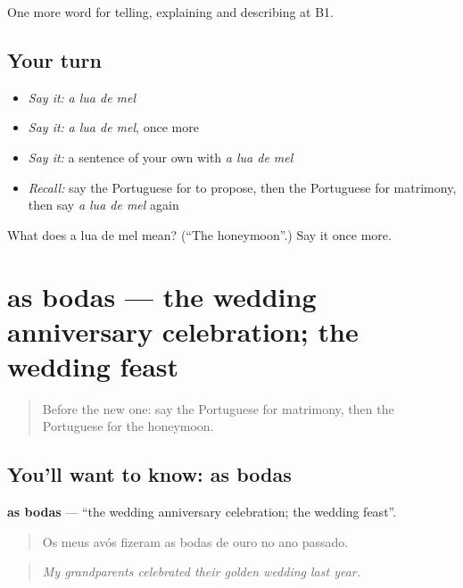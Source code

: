 \begin{grammarlens}[title={What you've built}]
One more word for telling, explaining and describing at B1.
\end{grammarlens}

\subsection*{Your turn}
\begin{itemize}
\raggedright
  \item \emph{Say it:} \emph{a lua de mel}
  \item \emph{Say it:} \emph{a lua de mel}, once more
  \item \emph{Say it:} a sentence of your own with \emph{a lua de mel}
  \item \emph{Recall:} say the Portuguese for to propose, then the Portuguese for matrimony, then say \emph{a lua de mel} again
\end{itemize}

\begin{tcolorbox}[breakable,colback=teal!4,colframe=teal!35!black,title={Before you move on}]
What does a lua de mel mean? (\textquotedblleft{}The honeymoon\textquotedblright{}.) Say it once more.
\end{tcolorbox}
\section[as bodas]{as bodas — the wedding anniversary celebration; the wedding feast}

\label{lesson:PT-C313-bodas}



\begin{quote}
Before the new one: say the Portuguese for matrimony, then the Portuguese for the honeymoon.
\end{quote}

\subsection*{You'll want to know: as bodas}
\textbf{as bodas} — \textquotedblleft{}the wedding anniversary celebration; the wedding feast\textquotedblright{}.

\begin{quote}
Os meus avós fizeram as bodas de ouro no ano passado.
\end{quote}

\begin{quote}
\emph{My grandparents celebrated their golden wedding last year.}
\end{quote}

